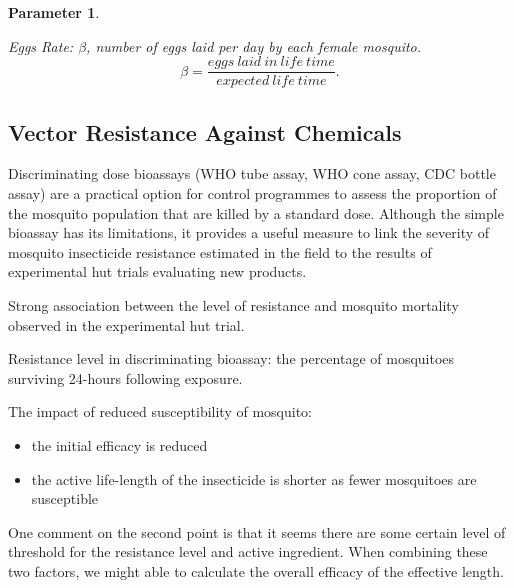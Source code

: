 \documentclass[a4paper, 12pt, twoside]{article}
\newtheorem{parameter}{Parameter}
\begin{document}
\begin{parameter}
	\label{para:eggs_laid_per_day}

	Eggs Rate: $\beta$, number of eggs laid per day by each female mosquito.
	\[
		\beta=\frac{eggs\:laid\:in\:life\:time}{expected\:life\:time}
		.\]

\end{parameter}

\subsection{Vector Resistance Against Chemicals}

Discriminating dose bioassays (WHO tube assay, WHO cone assay, CDC bottle assay) are a practical option for control programmes to assess the proportion of the mosquito population that are killed by a standard dose.
Although the simple bioassay has its limitations, it provides a useful measure to link the severity of mosquito insecticide resistance estimated in the field to the results of experimental hut trials evaluating new products.

Strong association between the level of resistance and mosquito mortality observed in the experimental hut trial\cite{Sherrard-Smith2018b}.

Resistance level in discriminating bioassay: the percentage of mosquitoes surviving 24-hours following exposure.

The impact of reduced susceptibility of mosquito:
\begin{itemize}
	\item the initial efficacy is reduced
	\item the active life-length of the insecticide is shorter as fewer mosquitoes are susceptible
\end{itemize}


One comment on the second point is that it seems there are some certain level of threshold for the resistance level and active ingredient. When combining these two factors, we might able to calculate the overall efficacy of the effective length.
\end{document}
